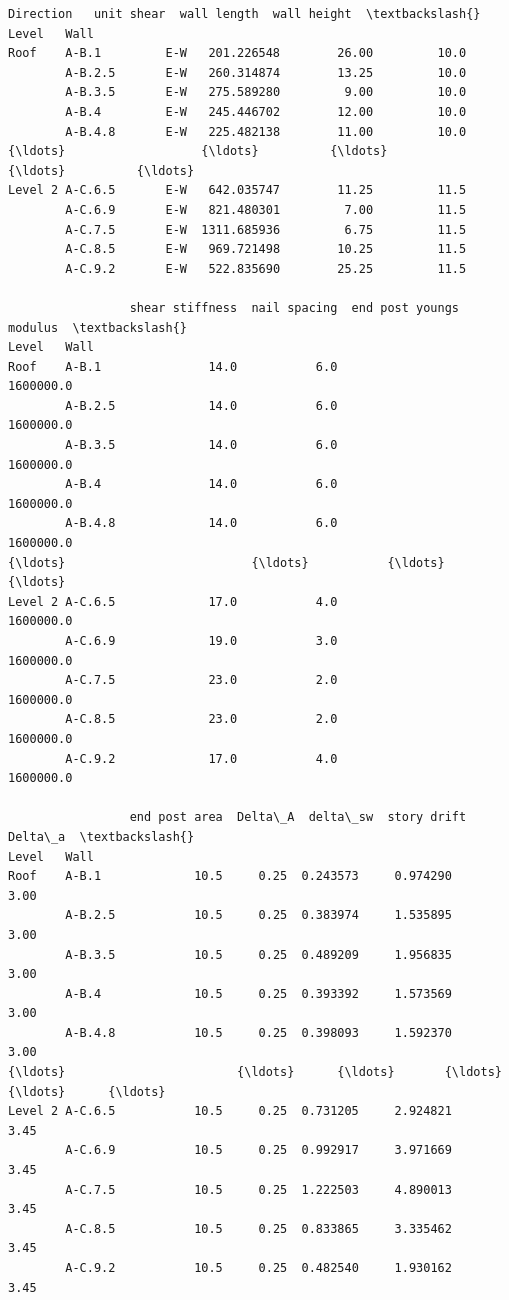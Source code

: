 \documentclass[11pt]{article}
\begin{document}
            \begin{tcolorbox}[breakable, size=fbox, boxrule=.5pt, pad at break*=1mm, opacityfill=0]
\begin{Verbatim}[commandchars=\\\{\}]
                Direction   unit shear  wall length  wall height  \textbackslash{}
Level   Wall
Roof    A-B.1         E-W   201.226548        26.00         10.0
        A-B.2.5       E-W   260.314874        13.25         10.0
        A-B.3.5       E-W   275.589280         9.00         10.0
        A-B.4         E-W   245.446702        12.00         10.0
        A-B.4.8       E-W   225.482138        11.00         10.0
{\ldots}                   {\ldots}          {\ldots}          {\ldots}          {\ldots}
Level 2 A-C.6.5       E-W   642.035747        11.25         11.5
        A-C.6.9       E-W   821.480301         7.00         11.5
        A-C.7.5       E-W  1311.685936         6.75         11.5
        A-C.8.5       E-W   969.721498        10.25         11.5
        A-C.9.2       E-W   522.835690        25.25         11.5

                 shear stiffness  nail spacing  end post youngs modulus  \textbackslash{}
Level   Wall
Roof    A-B.1               14.0           6.0                1600000.0
        A-B.2.5             14.0           6.0                1600000.0
        A-B.3.5             14.0           6.0                1600000.0
        A-B.4               14.0           6.0                1600000.0
        A-B.4.8             14.0           6.0                1600000.0
{\ldots}                          {\ldots}           {\ldots}                      {\ldots}
Level 2 A-C.6.5             17.0           4.0                1600000.0
        A-C.6.9             19.0           3.0                1600000.0
        A-C.7.5             23.0           2.0                1600000.0
        A-C.8.5             23.0           2.0                1600000.0
        A-C.9.2             17.0           4.0                1600000.0

                 end post area  Delta\_A  delta\_sw  story drift  Delta\_a  \textbackslash{}
Level   Wall
Roof    A-B.1             10.5     0.25  0.243573     0.974290     3.00
        A-B.2.5           10.5     0.25  0.383974     1.535895     3.00
        A-B.3.5           10.5     0.25  0.489209     1.956835     3.00
        A-B.4             10.5     0.25  0.393392     1.573569     3.00
        A-B.4.8           10.5     0.25  0.398093     1.592370     3.00
{\ldots}                        {\ldots}      {\ldots}       {\ldots}          {\ldots}      {\ldots}
Level 2 A-C.6.5           10.5     0.25  0.731205     2.924821     3.45
        A-C.6.9           10.5     0.25  0.992917     3.971669     3.45
        A-C.7.5           10.5     0.25  1.222503     4.890013     3.45
        A-C.8.5           10.5     0.25  0.833865     3.335462     3.45
        A-C.9.2           10.5     0.25  0.482540     1.930162     3.45


\end{Verbatim}
\end{tcolorbox}
\end{document}
